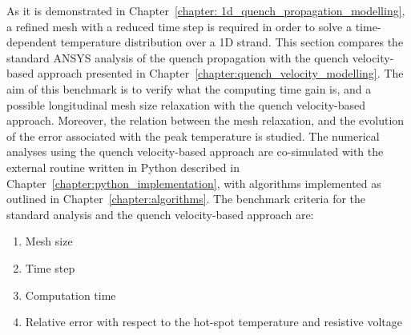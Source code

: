 
As it is demonstrated in Chapter~\ref{chapter: 1d_quench_propagation_modelling}, a refined mesh with a reduced time step is required in order to solve a time-dependent temperature distribution over a 1D strand. This section compares the standard ANSYS analysis of the quench propagation with the quench velocity-based approach presented in Chapter~\ref{chapter:quench_velocity_modelling}. The aim of this benchmark is to verify what the computing time gain is, and a possible longitudinal mesh size relaxation with the quench velocity-based approach. Moreover, the relation between the mesh relaxation, and the evolution of the error associated with the peak temperature is studied. The numerical analyses using the quench velocity-based approach are co-simulated with the external routine written in Python described in Chapter~\ref{chapter:python_implementation}, with algorithms implemented as outlined in Chapter~\ref{chapter:algorithms}. The benchmark criteria for the standard analysis and the quench velocity-based approach are: 
\begin{enumerate}
    \item Mesh size
    \item Time step
    \item Computation time
    \item Relative error with respect to the hot-spot temperature and resistive voltage
\end{enumerate}